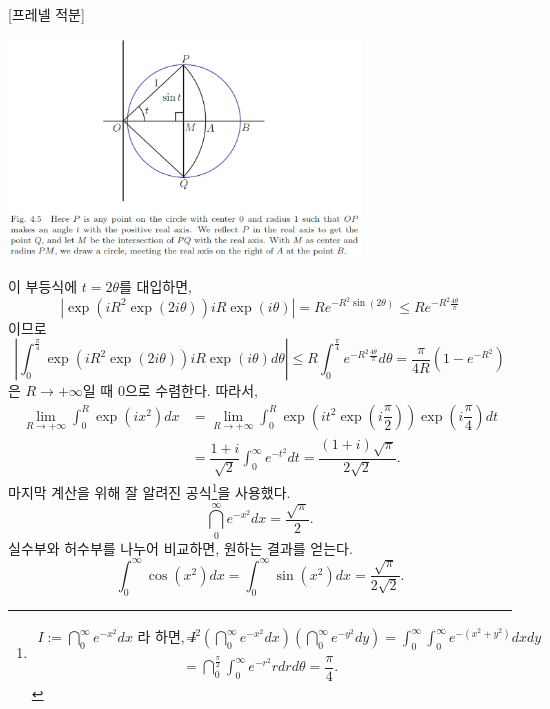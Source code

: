 \begin{saltexample}{[프레넬 적분]}{}
\begin{center}
\includegraphics[width=0.7\textwidth]{./SaltChapter/fig-4-5}
\end{center}
\label{fig-4-5}
이 부등식에 $t=2\theta$를 대입하면,
\[
\left| \exp(iR^2\exp(2i\theta))iR\exp(i\theta) \right|
= Re^{-R^2\sin(2\theta)} \le Re^{-R^2\frac{4\theta}\pi}
\]
이므로
\[
\left| \int_0^{\frac\pi4} \exp(iR^2\exp(2i\theta))iR\exp(i\theta) d\theta\right|
\le R \int_0^{\frac\pi4} e^{-R^2\frac{4\theta}\pi}d\theta
= \dfrac\pi{4R}(1-e^{-R^2})
\]
은 $R\to +\infty$일 때 $0$으로 수렴한다.
따라서, 
\begin{align*}
\lim_{R\to+\infty} \int_0^R \exp(ix^2)dx 
&=  \lim_{R\to+\infty}\int_0^R  \exp\left( it^2\exp\left( i\dfrac\pi2 \right)\right)
\exp\left(i\dfrac\pi4\right) dt \\
&= \dfrac{1+i}{\sqrt{2}} \int_0^\infty e^{-t^2}dt 
= \dfrac{(1+i)\sqrt{\pi}}{2\sqrt{2}}.
\end{align*}
마지막 계산을 위해 잘 알려진 공식\footnote{
\begin{align*}
I:=\dint_0^\infty e^{-x^2} dx\text{  라 하면, \ } 
I^2 &= \left(\dint_0^\infty e^{-x^2} dx\right)\left(\dint_0^\infty e^{-y^2} dy\right) 
= \int_0^\infty \int_0^\infty e^{-(x^2+y^2)}dxdy \\
&= \dint_0^{\frac\pi2} \int_0^\infty e^{-r^2}rdrd\theta = \dfrac\pi4.
\end{align*}
}을 사용했다.
\[
\dint_0^\infty e^{-x^2} dx = \dfrac{\sqrt{\pi}}2.
\]
실수부와 허수부를 나누어 비교하면, 원하는 결과를 얻는다.
\[
\int_0^\infty \cos(x^2) dx =  \int_0^\infty \sin(x^2) dx 
= \dfrac{\sqrt{\pi}}{2\sqrt{2}}.
\]
\end{saltexample}

